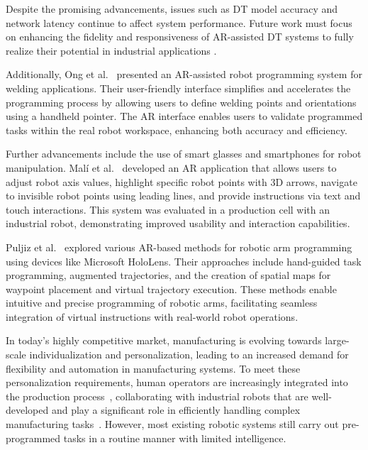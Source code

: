     Despite the promising advancements, issues such as \ac{DT} model accuracy and network latency continue to affect system performance. Future work must 
    focus on enhancing the fidelity and responsiveness of \ac{AR}-assisted \ac{DT} systems to fully realize their potential in industrial applications 
    \cite{LI2022102321}.

    Additionally, Ong et al.~\cite{ong2020} presented an AR-assisted robot programming system for welding applications. Their user-friendly interface 
    simplifies and accelerates the programming process by allowing users to define welding points and orientations using a handheld pointer. 
    The \ac{AR} interface enables users to validate programmed tasks within the real robot workspace, enhancing both accuracy and efficiency.
    
    Further advancements include the use of smart glasses and smartphones for robot manipulation. Malí et al.~\cite{7819154} developed an \ac{AR} 
    application that allows users to adjust robot axis values, highlight specific robot points with 3D arrows, navigate to invisible robot points using
    leading lines, and provide instructions via text and touch interactions. This system was evaluated in a production cell with an industrial robot, 
    demonstrating improved usability and interaction capabilities.

    Puljiz et al.~\cite{puljiz2019conceptsendtoendaugmentedreality,puljiz2} explored various AR-based methods for robotic arm programming using devices like Microsoft HoloLens. 
    Their approaches include hand-guided task programming, augmented trajectories, and the creation of spatial maps for waypoint placement and virtual 
    trajectory execution. These methods enable intuitive and precise programming of robotic arms, facilitating seamless integration of virtual instructions 
    with real-world robot operations.
    
    In today's highly competitive market, manufacturing is evolving towards large-scale individualization and personalization, leading to an increased demand for flexibility and automation in manufacturing systems. To meet these personalization requirements, human operators are increasingly integrated into the production process~\cite{1}, collaborating with industrial robots that are well-developed and play a significant role in efficiently handling complex manufacturing tasks~\cite{2,3}.
    However, most existing robotic systems still carry out pre-programmed tasks in a routine manner with limited intelligence.

